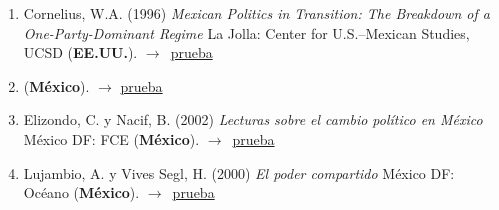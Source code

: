 \documentclass[12 pt, letter]{article}
\newenvironment{CitasMiTrabajo}{
    \begin{footnotesize}
    \begin{enumerate}[label={\footnotesize\emph{cita~\arabic*}},ref=\arabic*] %
        \setlength{\itemsep}{.1\itemsep}
        \setlength{\parskip}{.1\parskip}
    }{\end{enumerate}\end{footnotesize}}
\begin{document}

        \begin{CitasMiTrabajo}

        \item Cornelius, W.A. (1996)
        \emph{Mexican Politics in Transition: The Breakdown of a One-Party-Dominant Regime}
        La Jolla: Center for U.S.--Mexican Studies, UCSD (\textbf{EE.UU.}). $\rightarrow$~\href{https://github.com/emagar/cv/blob/master/citasMiTrab/tesisItam/corneliusMPIT.pdf}{prueba}

        \item {} (\textbf{M\'exico}). $\rightarrow$ \href{https://github.com/emagar/cv/blob/master/citasMiTrab/tesisItam/deremesYuxtap1999pyg.pdf}{prueba}

        \item Elizondo, C. y Nacif, B. (2002)
        \emph{Lecturas sobre el cambio pol\'itico en M\'exico}
        M\'exico DF: FCE (\textbf{M\'exico}). $\rightarrow$~\href{https://github.com/emagar/cv/blob/master/citasMiTrab/tesisItam/elizNacif.pdf}{prueba}

        \item Lujambio, A. y Vives Segl, H. (2000)
        \emph{El poder compartido}
        M\'exico DF: Oc\'eano (\textbf{M\'exico}). $\rightarrow$~\href{https://github.com/emagar/cv/blob/master/citasMiTrab/tesisItam/LujambioVivesPC.pdf}{prueba}


        \label{ncites:magar.1994} %

        \end{CitasMiTrabajo}
\end{document}
